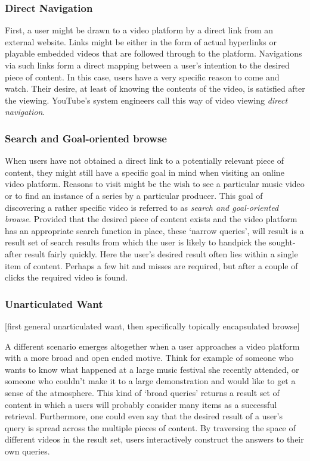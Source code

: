 \subsubsection{Direct Navigation}
First, a user might be drawn to a video platform by a direct link from an external website. Links might be either in the form of actual hyperlinks or playable embedded videos that are followed through to the platform. Navigations via such links form a direct mapping between a user's intention to the desired piece of content. In this case, users have a very specific reason to come and watch. Their desire, at least of knowing the contents of the video, is satisfied after the viewing. YouTube's system engineers call this way of video viewing \emph{direct navigation}\cite{Davidson:2010tu}.

\subsubsection{Search and Goal-oriented browse}
When users have not obtained a direct link to a potentially relevant piece of content, they might still have a specific goal in mind when visiting an online video platform. Reasons to visit might be the wish to see a particular music video or to find an instance of a series by a particular producer. This goal of discovering a rather specific video is referred to as \emph{search and goal-oriented browse}. Provided that the desired piece of content exists and the video platform has an appropriate search function in place, these `narrow queries', will result is a result set of search results from which the user is likely to handpick the sought-after result fairly quickly. Here the user's desired result often lies within a single item of content. Perhaps a few hit and misses are required, but after a couple of clicks the required video is found.

\subsubsection{Unarticulated Want}

[first general unarticulated want, then specifically topically encapsulated browse]

A different scenario emerges altogether when a user approaches a video platform with a more broad and open ended motive. Think for example of someone who wants to know what happened at a large music festival she recently attended, or someone who couldn't make it to a large demonstration and would like to get a sense of the atmosphere. This kind of `broad queries' returns a result set of content in which a users will probably consider many items as a successful retrieval. Furthermore, one could even say that the desired result of a user's query is spread across the multiple pieces of content. By traversing the space of different videos in the result set, users interactively construct the answers to their own queries.

